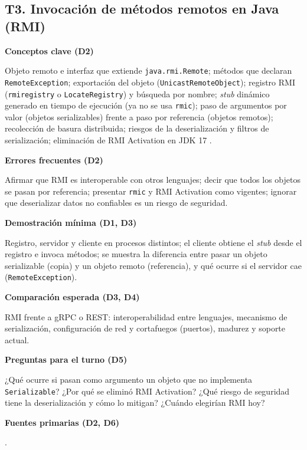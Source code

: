 \documentclass[11pt,a4paper]{article}
\newcommand{\campo}[1]{\par\smallskip\textbf{\color{uteqBlue}#1}\par}
\begin{document}
\subsection{T3. Invocación de métodos remotos en Java (RMI)}
\begin{fichaBox}[title={Ficha T3 --- RMI}]
	\campo{Conceptos clave (D2)}
	Objeto remoto e interfaz que extiende \texttt{java.rmi.Remote}; métodos que declaran \texttt{RemoteException}; exportación del objeto (\texttt{UnicastRemoteObject}); registro RMI (\texttt{rmiregistry} o \texttt{LocateRegistry}) y búsqueda por nombre; \emph{stub} dinámico generado en tiempo de ejecución (ya no se usa \texttt{rmic}); paso de argumentos por valor (objetos serializables) frente a paso por referencia (objetos remotos); recolección de basura distribuida; riesgos de la deserialización y filtros de serialización; eliminación de RMI Activation en JDK 17 \cite{oracle2023rmiarch,wollrath1996distributed,oracle2023serialfilter,openjdk2021jep407}.
	\campo{Errores frecuentes (D2)}
	Afirmar que RMI es interoperable con otros lenguajes; decir que todos los objetos se pasan por referencia; presentar \texttt{rmic} y RMI Activation como vigentes; ignorar que deserializar datos no confiables es un riesgo de seguridad.
	\campo{Demostración mínima (D1, D3)}
	Registro, servidor y cliente en procesos distintos; el cliente obtiene el \emph{stub} desde el registro e invoca métodos; se muestra la diferencia entre pasar un objeto serializable (copia) y un objeto remoto (referencia), y qué ocurre si el servidor cae (\texttt{RemoteException}).
	\campo{Comparación esperada (D3, D4)}
	RMI frente a gRPC o REST: interoperabilidad entre lenguajes, mecanismo de serialización, configuración de red y cortafuegos (puertos), madurez y soporte actual.
	\campo{Preguntas para el turno (D5)}
	¿Qué ocurre si pasan como argumento un objeto que no implementa \texttt{Serializable}? ¿Por qué se eliminó RMI Activation? ¿Qué riesgo de seguridad tiene la deserialización y cómo lo mitigan? ¿Cuándo elegirían RMI hoy?
	\campo{Fuentes primarias (D2, D6)}
	\cite{oracle2023rmiarch,wollrath1996distributed,oracle2023serialfilter,openjdk2021jep407,waldo1997note}.
\end{fichaBox}

\end{document}
